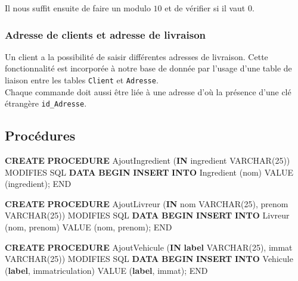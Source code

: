 \documentclass[]{article}
\newenvironment{Shaded}{}{}
\newcommand{\KeywordTok}[1]{\textcolor[rgb]{0.00,0.44,0.13}{\textbf{#1}}}
\newcommand{\DataTypeTok}[1]{\textcolor[rgb]{0.56,0.13,0.00}{#1}}
\newcommand{\DecValTok}[1]{\textcolor[rgb]{0.25,0.63,0.44}{#1}}
\newcommand{\FunctionTok}[1]{\textcolor[rgb]{0.02,0.16,0.49}{#1}}
\newcommand{\NormalTok}[1]{#1}
\begin{document}
Il nous suffit ensuite de faire un modulo \(10\) et de vérifier si il
vaut \(0\).

\subsubsection{Adresse de clients et adresse de
    livraison}\label{adresse-de-clients-et-adresse-de-livraison}

Un client a la possibilité de saisir différentes adresses de livraison.
Cette fonctionnalité est incorporée à notre base de donnée par l'usage
d'une table de liaison entre les tables \texttt{Client} et
\texttt{Adresse}.\\
Chaque commande doit aussi être liée à une adresse d'où la présence d'une clé
étrangère \texttt{id\_Adresse}.

\subsection{Procédures}\label{procuxe9dures}

\begin{Shaded}
    \begin{Highlighting}[]
        \KeywordTok{CREATE} \KeywordTok{PROCEDURE}\NormalTok{ AjoutIngredient (}\KeywordTok{IN}\NormalTok{ ingredient }\DataTypeTok{VARCHAR}\NormalTok{(}\DecValTok{25}\NormalTok{)) MODIFIES SQL }\KeywordTok{DATA}
        \KeywordTok{BEGIN}
        \KeywordTok{INSERT} \KeywordTok{INTO}\NormalTok{ Ingredient (nom) }\FunctionTok{VALUE}\NormalTok{ (ingredient);}
        \NormalTok{END}

        \KeywordTok{CREATE} \KeywordTok{PROCEDURE}\NormalTok{ AjoutLivreur (}\KeywordTok{IN}\NormalTok{ nom }\DataTypeTok{VARCHAR}\NormalTok{(}\DecValTok{25}\NormalTok{), prenom }\DataTypeTok{VARCHAR}\NormalTok{(}\DecValTok{25}\NormalTok{)) MODIFIES SQL }\KeywordTok{DATA}
        \KeywordTok{BEGIN}
        \KeywordTok{INSERT} \KeywordTok{INTO}\NormalTok{ Livreur (nom, prenom) }\FunctionTok{VALUE}\NormalTok{ (nom, prenom);}
        \NormalTok{END}

        \KeywordTok{CREATE} \KeywordTok{PROCEDURE}\NormalTok{ AjoutVehicule (}\KeywordTok{IN} \KeywordTok{label} \DataTypeTok{VARCHAR}\NormalTok{(}\DecValTok{25}\NormalTok{), immat }\DataTypeTok{VARCHAR}\NormalTok{(}\DecValTok{25}\NormalTok{)) MODIFIES SQL }\KeywordTok{DATA}
        \KeywordTok{BEGIN}
        \KeywordTok{INSERT} \KeywordTok{INTO}\NormalTok{ Vehicule (}\KeywordTok{label}\NormalTok{, immatriculation) }\FunctionTok{VALUE}\NormalTok{ (}\KeywordTok{label}\NormalTok{, immat);}
        \NormalTok{END}
    \end{Highlighting}
\end{Shaded}
\end{document}
